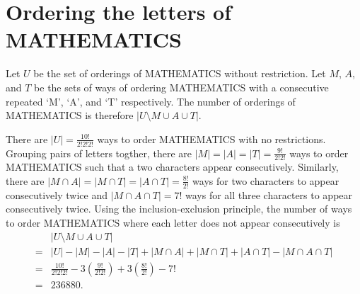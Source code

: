 \documentclass{article}
\begin{document}
   \section{Ordering the letters of MATHEMATICS}
      Let $U$ be the set of orderings of MATHEMATICS
      without restriction.
      Let $M$, $A$, and $T$ be 
      the sets of ways of ordering MATHEMATICS
      with a consecutive repeated `M', `A', and `T' respectively.
      The number of orderings of MATHEMATICS is therefore
      $|U \setminus M \cup A \cup T|$.

      There are $|U| = \frac{10!}{2!2!2!}$ ways to order MATHEMATICS
      with no restrictions. 
      Grouping pairs of letters togther, 
      there are $|M| = |A| = |T| = \frac{9!}{2!2!}$ ways to order MATHEMATICS 
      such that a two characters appear consecutively.
      Similarly, there are $|M \cap A| = |M \cap T| = |A \cap T| = \frac{8!}{2!}$ 
      ways for two characters to appear consecutively twice
      and $|M \cap A \cap T| = 7!$ ways 
      for all three characters to appear consecutively twice.
      Using the inclusion-exclusion principle,
      the number of ways to order MATHEMATICS 
      where each letter does not appear consecutively is
      \begin{align*}
         &|U \setminus M \cup A \cup T| \\
         = &|U| - |M| - |A| - |T|
            + |M \cap A| + |M \cap T| + |A \cap T| 
            - |M \cap A \cap T| \\
         = &\frac{10!}{2!2!2!} - 3\left(\frac{9!}{2!2!}\right)
            + 3\left(\frac{8!}{2!}\right) - 7! \\
         = &236880.
      \end{align*}
   \newpage 
\end{document}
